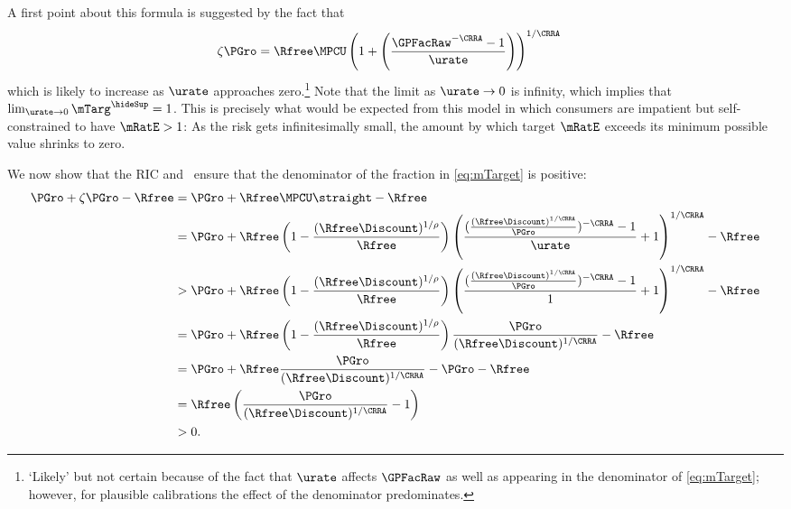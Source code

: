 \documentclass{\handout}
\begin{document}
A first point about this formula is suggested by the fact that
\begin{equation}\begin{gathered}\begin{aligned}
  \zeta\PGro & =  \Rfree \MPCU \left(1+\left(\frac{\GPFacRaw^{-\CRRA} - 1}{\urate}\right)\right)^{1/\CRRA}
\end{aligned}\end{gathered}\end{equation}
which is likely to increase as $\urate$ approaches zero.\footnote{`Likely' but not certain because of the fact that $\urate$ affects $\GPFacRaw$ as well as
  appearing in the denominator of \eqref{eq:mTarget}; however, for
  plausible calibrations the effect of the denominator predominates.}
Note that the limit as $\urate \rightarrow 0$ is infinity, which
implies that $\lim_{\urate \rightarrow
  0} \mTarg^{\hideSup} = 1$.  This is precisely what would be expected from
this model in which consumers are impatient but self-constrained to
have $\mRatE > 1$:  As the risk gets infinitesimally small, the
amount by which target $\mRatE$ exceeds its minimum possible value shrinks to
zero.

We now show that the RIC and \GICPGro~ensure that the denominator of the fraction in \eqref{eq:mTarget} is positive: 
\begin{equation*}\begin{gathered}\begin{aligned}
\PGro + \zeta \PGro - \Rfree & =  \PGro + \Rfree \MPCU \straight - \Rfree
 \\& =  \PGro + \Rfree \left(1- \frac{(\Rfree \Discount)^{1/\rho}}{\Rfree}\right) \left(\frac{(\frac{(\Rfree\Discount)^{1/\CRRA}}{\PGro})^{-\CRRA}-1}{\urate}+1\right)^{1/\CRRA}-\Rfree
 \\& >   \PGro+\Rfree \left(1-\frac{(\Rfree\Discount)^{1/\rho}}{\Rfree}\right)
\left(\frac{(\frac{(\Rfree\Discount)^{1/\CRRA}}{\PGro})^{-\CRRA}-1}{1}+1\right)^{1/\CRRA}-\Rfree
 \\& =  \PGro+\Rfree\left(1-\frac{(\Rfree\Discount)^{1/\rho}}{\Rfree}\right)\frac{\PGro}{(\Rfree\Discount)^{1/\CRRA}}-\Rfree
 \\& =  \PGro+\Rfree \frac{\PGro}{(\Rfree\Discount)^{1/\CRRA}}- \PGro - \Rfree
 \\& =  \Rfree \left(\frac{\PGro}{(\Rfree\Discount)^{1/\CRRA}}-1\right)
 \\& >  0.
\end{aligned}\end{gathered}\end{equation*}
\end{document}

